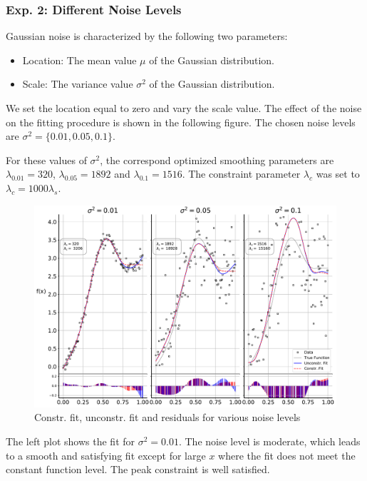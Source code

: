 \documentclass[10pt,a4paper]{article}
\begin{document}
\subsubsection{Exp. 2: Different Noise Levels}

Gaussian noise is characterized by the following two parameters:
\begin{itemize}
	\item Location: The mean value $\mu$ of the Gaussian distribution.
	\item Scale: The variance value $\sigma^2$ of the Gaussian distribution.
\end{itemize}

We set the location equal to zero and vary the scale value. The effect of the noise on the fitting procedure is shown in the following figure. The chosen noise levels are $\sigma^2 = \{0.01, 0.05, 0.1\}$.

For these values of $\sigma^2$, the correspond optimized smoothing parameters are $\lambda_{0.01} = 320$, $\lambda_{0.05} = 1892$ and $\lambda_{0.1} = 1516$. The constraint parameter $\lambda_c$ was set to $\lambda_c = 1000 \lambda_s$. 

\begin{figure}[H]
	\centering
	\includegraphics[width=\columnwidth]{../thesisplots/exp_noise_levels.pdf}
	\caption{Constr. fit, unconstr. fit and residuals for various noise levels}
	\label{fig:fit_noise_levels}
\end{figure}

The left plot shows the fit for $\sigma^2 = 0.01$. The noise level is moderate, which leads to a smooth and satisfying fit except for large $x$ where the fit does not meet the constant function level. The peak constraint is well satisfied. 
\end{document}
